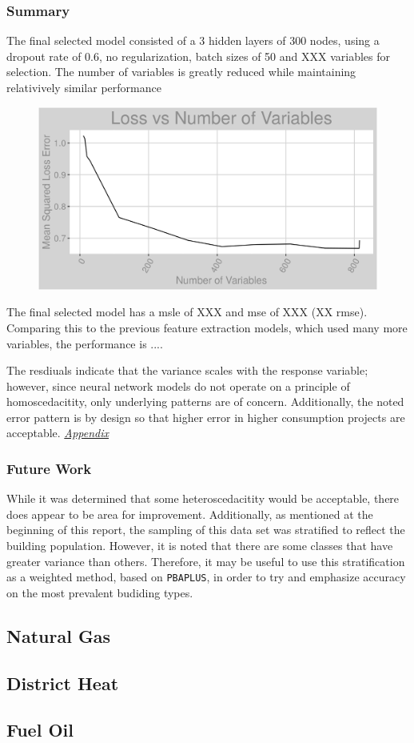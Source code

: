 \subsubsection{Summary}
The final selected model consisted of a 3 hidden layers of 300 nodes, using a dropout rate of 0.6, no regularization, batch sizes of 50 and XXX variables for selection.  The number of variables is greatly reduced while maintaining relativively similar performance

\begin{figure}[h]
\centering
\includegraphics[width=\textwidth, height=0.25\textheight]{Images/electricity_nn_error.png}
\end{figure}

The final selected model has a msle of XXX and mse of XXX (XX rmse).  Comparing this to the previous feature extraction models, which used many more variables, the performance is ....

The resdiuals indicate that the variance scales with the response variable; however, since neural network models do not operate on a principle of homoscedacitity, only underlying patterns are of concern. Additionally, the noted error pattern is by design so that higher error in higher consumption projects are acceptable.  \textit{\hyperref[appendix:electricity:nn_full]{Appendix}}

\subsubsection{Future Work}
While it was determined that some heteroscedacitity would be acceptable, there does appear to be area for improvement.  Additionally, as mentioned at the beginning of this report, the sampling of this data set was stratified to reflect the building population.  However, it is noted that there are some classes that have greater variance than others.  Therefore, it may be useful to use this stratification as a weighted method, based on \lstinline{PBAPLUS}, in order to try and emphasize accuracy on the most prevalent budiding types. 

\FloatBarrier
\newpage
\subsection{Natural Gas}

\FloatBarrier
\newpage
\subsection{District Heat}

\FloatBarrier
\newpage
\subsection{Fuel Oil}